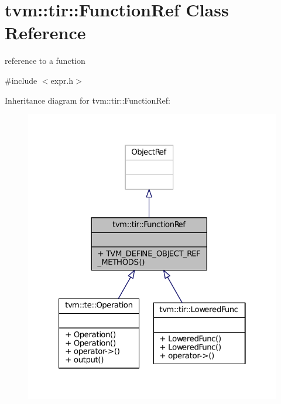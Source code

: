 \hypertarget{classtvm_1_1tir_1_1FunctionRef}{}\section{tvm\+:\+:tir\+:\+:Function\+Ref Class Reference}
\label{classtvm_1_1tir_1_1FunctionRef}


reference to a function  




{\ttfamily \#include $<$expr.\+h$>$}



Inheritance diagram for tvm\+:\+:tir\+:\+:Function\+Ref\+:
\nopagebreak
\begin{figure}[H]
\begin{center}
\leavevmode
\includegraphics[width=322pt]{classtvm_1_1tir_1_1FunctionRef__inherit__graph}
\end{center}
\end{figure}


